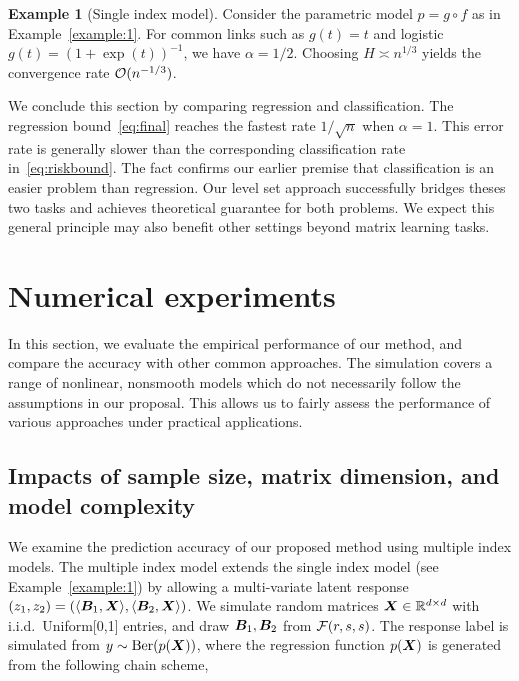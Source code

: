 \documentclass[11pt]{article}
\theoremstyle{plain}
\theoremstyle{definition}
\newtheorem{example}{Example}
\begin{document}
\begin{example}[Single index model]
Consider the parametric model $p=g\circ f$ as in Example~\ref{example:1}. For common links such as $g(t)=t$ and logistic $g(t)=(1+\exp(t))^{-1}$, we have $\alpha=1/2$. Choosing $H\asymp n^{1/3}$ yields the convergence rate $\mathcal{O}(n^{-1/3})$.  
\end{example}

We conclude this section by comparing regression and classification. The regression bound~\eqref{eq:final} reaches the fastest rate $1/\sqrt{n}$ when $\alpha=1$. This error rate is generally slower than the corresponding classification rate in~\eqref{eq:riskbound}. The fact confirms our earlier premise that classification is an easier problem than regression. Our level set approach successfully bridges theses two tasks and achieves theoretical guarantee for both problems. We expect this general principle may also benefit other settings beyond matrix learning tasks.  





\section{Numerical experiments}\label{sec:data}
In this section, we evaluate the empirical performance of our method, and compare the accuracy with other common approaches. The simulation covers a range of nonlinear, nonsmooth models which do not necessarily follow the assumptions in our proposal. This allows us to fairly assess the performance of various approaches under practical applications. 

\subsection{Impacts of sample size, matrix dimension, and model complexity}\label{sec:validation}
We examine the prediction accuracy of our proposed method using multiple index models. The multiple index model extends the single index model (see Example~\ref{example:1}) by allowing a multi-variate latent response $(z_1,z_2)=\left(\langle \bm B_1, \bm X \rangle,\langle \bm B_2, \bm X \rangle\right)$. We simulate random matrices $\bm X\in\mathbb{R}^{d\times d}$ with i.i.d.\ Uniform[0,1] entries, and draw $\bm B_1, \bm B_2$ from $\mathcal{F}(r,s,s)$. The response label is simulated from $y\sim \text{Ber}(p(\bm X))$, where the regression function $p(\bm X)$ is generated from the following chain scheme,
\end{document}
